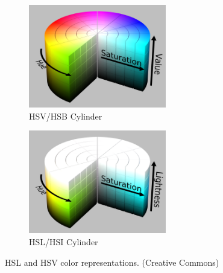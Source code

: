\documentclass[letterpaper]{article}
\begin{document}
{\begin{figure}[H]
	\centering
	\begin{subfigure}[h]{.45\textwidth}
		\centering
		\includegraphics[width=6cm]{./figures/HSV_color_solid_cylinder_saturation_gray.png}
		\caption{HSV/HSB Cylinder}
		\label{fig:hsv}
	\end{subfigure}
	\hfill
	\begin{subfigure}[h]{.45\textwidth}
		\centering
		\includegraphics[width=6cm]{./figures/HSL_color_solid_cylinder_saturation_gray.png}
		\caption{HSL/HSI Cylinder}
		\label{fig:hsl}
	\end{subfigure}
	\caption[HSL and HSV color representations]{HSL and HSV color representations. (Creative Commons)}
	\label{fig:overlap}
\end{figure}

}
\end{document}
